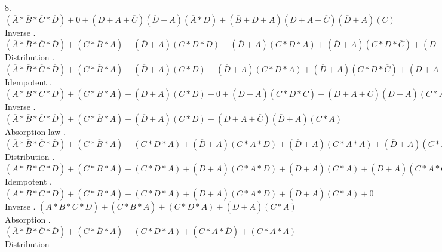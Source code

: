 \documentclass{article}
\begin{document}
\begin{itemize}
    8. $(\overline{A} * \overline{B} * \overline{C} * \overline{D}) +
    0 +
    (D + A + \overline{C})(\overline{D} + A)(\overline{A} * D) +
    (\overline{B} + D + A)(D + A + \overline{C})(\overline{D} + A)(C)$ Inverse . $(\overline{A} * \overline{B} * \overline{C} * \overline{D}) +
    (C * \overline{B} * A) + (\overline{D} + A)(C * D * D) + (\overline{D} + A)(C * D * A) + (\overline{D} + A)(C * D * \overline{C}) + (D + A + \overline{C})(\overline{D} + A)(C * A)$ Distribution . $(\overline{A} * \overline{B} * \overline{C} * \overline{D}) +
    (C * \overline{B} * A) + (\overline{D} + A)(C * D) + (\overline{D} + A)(C * D * A) + (\overline{D} + A)(C * D * \overline{C}) + (D + A + \overline{C})(\overline{D} + A)(C * A)$ Idempotent . $(\overline{A} * \overline{B} * \overline{C} * \overline{D}) +
    (C * \overline{B} * A) + (\overline{D} + A)(C * D) + 0 + (\overline{D} + A)(C * D * \overline{C}) + (D + A + \overline{C})(\overline{D} + A)(C * A)$ Inverse . $(\overline{A} * \overline{B} * \overline{C} * \overline{D}) +
    (C * \overline{B} * A) + (\overline{D} + A)(C * D) +
    (D + A + \overline{C})(\overline{D} + A)(C * A)$ Absorption law . $(\overline{A} * \overline{B} * \overline{C} * \overline{D}) +
    (C * \overline{B} * A) + (C * D * A) + (\overline{D} + A)(C * A * D) +
    (\overline{D} + A)(C * A * A) + (\overline{D} + A)(C * A * \overline{C})$ Distribution . $(\overline{A} * \overline{B} * \overline{C} * \overline{D}) +
    (C * \overline{B} * A) + (C * D * A) + (\overline{D} + A)(C * A * D) +
    (\overline{D} + A)(C * A) + (\overline{D} + A)(C * A * \overline{C})$ Idempotent . $(\overline{A} * \overline{B} * \overline{C} * \overline{D}) +
    (C * \overline{B} * A) + (C * D * A) + (\overline{D} + A)(C * A * D) +
    (\overline{D} + A)(C * A) + 0$ Inverse . $(\overline{A} * \overline{B} * \overline{C} * \overline{D}) +
    (C * \overline{B} * A) + (C * D * A) + (\overline{D} + A)(C * A)$ Absorption . $(\overline{A} * \overline{B} * \overline{C} * \overline{D}) +
    (C * \overline{B} * A) + (C * D * A) + (C * A * \overline{D}) + (C * A * A)$ Distribution \newline

\end{itemize}
\end{document}
